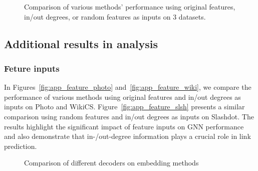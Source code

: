 \begin{figure*}[h]
    \centering
   \vspace{-2mm}
   \hspace{-3mm}
   \hspace{-5mm}
   \hspace{-4mm}
   \hspace{-4mm}
   \vspace{-2mm}
   \caption{Comparison of various methods' performance using original features, in/out degrees, or random features as inputs on 3 datasets.}
    \vspace{-2mm}
   \label{fig:app_feature}
\end{figure*}

\hypertarget{app_bench_res_ana}{}
\subsection{Additional results in analysis}
\label{app_bench_res_ana}

\subsubsection{Feture inputs}\label{app_feature_input}
In Figures~\ref{fig:app_feature_photo} and~\ref{fig:app_feature_wiki}, we compare the performance of various methods using original features and in/out degrees as inputs on Photo and WikiCS. Figure~\ref{fig:app_feature_slsh} presents a similar comparison using random features and in/out degrees as inputs on Slashdot. The results highlight the significant impact of feature inputs on GNN performance and also demonstrate that in-/out-degree information plays a crucial role in link prediction.

 \begin{figure}[ht]
    \centering
   \vspace{-1mm}
    \vspace{-2mm}
   \caption{Comparison of different decoders on embedding methods}
   \vspace{-1mm}
    \label{fig:app_loss_embedding}
 \end{figure}

